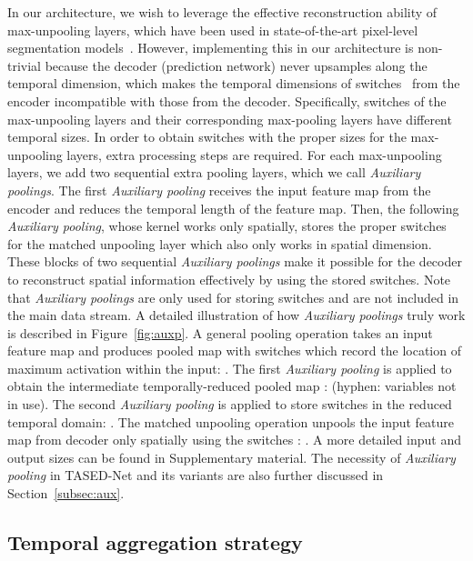 \documentclass[10pt,twocolumn,letterpaper]{article}
\newcommand{\modelname}{TASED-Net}
\newcommand{\auxpnamet}{Auxiliary pooling}
\newcommand{\auxpname}{\textit{\auxpnamet}}
\begin{document}
In our architecture, we wish to leverage the effective reconstruction ability of max-unpooling layers, which have been used in state-of-the-art pixel-level segmentation models~\cite{badrinarayanan2015segnet, noh2015learning}. However, implementing this in our architecture is non-trivial because the decoder (prediction network) never upsamples along the temporal dimension, which makes the temporal dimensions of switches~\cite{zeiler2011adaptive} from the encoder incompatible with those from the decoder. Specifically, switches of the max-unpooling layers and their corresponding max-pooling layers have different temporal sizes. In order to obtain switches with the proper sizes for the max-unpooling layers, extra processing steps are required. For each max-unpooling layers, we add two sequential extra pooling layers, which we call \auxpname{\textit{s}}. The first \auxpname{} receives the input feature map from the encoder and reduces the temporal length of the feature map. Then, the following \auxpname{}, whose kernel works only spatially, stores the proper switches for the matched unpooling layer which also only works in spatial dimension. These blocks of two sequential \auxpname{\textit{s}} make it possible for the decoder to reconstruct spatial information effectively by using the stored switches. Note that \auxpname{\textit{s}} are only used for storing switches and are not included in the main data stream. A detailed illustration of how \auxpname{\textit{s}} truly work is described in Figure~\ref{fig:auxp}. A general pooling operation  takes an input feature map  and produces pooled map  with switches  which record the location of maximum activation within the input: . The first \auxpname{} is applied to obtain the intermediate temporally-reduced pooled map :  (hyphen: variables not in use). The second \auxpname{} is applied to store switches in the reduced temporal domain: . The matched unpooling operation  unpools the input feature map from decoder only spatially using the switches : . A more detailed input and output sizes can be found in Supplementary material. The necessity of \auxpname{} in \modelname{} and its variants are also further discussed in Section~\ref{subsec:aux}.


\subsection{Temporal aggregation strategy}
\end{document}
